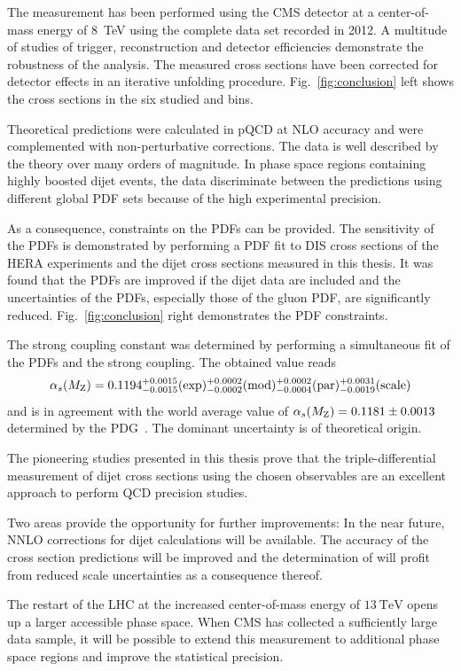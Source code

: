 The measurement has been performed using the CMS detector at a center-of-mass
energy of \SI{8}{\TeV} using the complete data set recorded in 2012. A multitude
of studies of trigger, reconstruction and detector efficiencies demonstrate the
robustness of the analysis. The measured cross sections have been corrected for
detector effects in an iterative unfolding procedure. Fig.~\ref{fig:conclusion}
left shows the cross sections in the six studied \ystar and \yboost bins.

Theoretical predictions were calculated in pQCD at NLO accuracy and were
complemented with non-perturbative corrections. The data is well
described by the theory over many orders of magnitude. In phase space regions
containing highly boosted dijet events, the data discriminate between the
predictions using different global PDF sets because of the high experimental
precision.

As a consequence, constraints on the PDFs can be provided. The sensitivity of
the PDFs is demonstrated by performing a PDF fit to DIS cross sections of the
HERA experiments and the dijet cross sections measured in this thesis. It was
found that the PDFs are improved if the dijet data are included and the
uncertainties of the PDFs, especially those of the gluon PDF, are
significantly reduced. Fig.~\ref{fig:conclusion} right demonstrates the PDF
constraints.

The strong coupling constant \asmz was determined by performing a simultaneous
fit of the PDFs and the strong coupling. The obtained value reads
%
\begin{equation*}
  \alpha_{s}(M_\mathrm{Z}) = 0.1194_{-0.0015}^{+0.0015}(\mathrm{exp})_{-0.0002}^{+0.0002}(\mathrm{mod})_{-0.0004}^{+0.0002}(\mathrm{par})_{-0.0019}^{+0.0031}(\mathrm{scale})
\end{equation*}
%
and is in agreement with the world average value of $\alpha_{s}(M_\mathrm{Z}) = 0.1181 \pm
0.0013$ determined by the PDG~\cite{Agashe:2014kda}. The dominant uncertainty is
of theoretical origin.

The pioneering studies presented in this thesis prove that the triple-differential
measurement of dijet cross sections using the chosen observables are an
excellent approach to perform QCD precision studies.

Two areas provide the opportunity for further improvements: In the near future,
NNLO corrections for dijet calculations will be available. The accuracy of the
cross section predictions will be improved and the determination of
\asmz will profit from reduced scale uncertainties as a consequence thereof. 

The restart of the LHC at the increased center-of-mass energy of $\SI{13}{\TeV}$
opens up a larger accessible phase space. When CMS has collected a sufficiently
large data sample, it will be possible to extend this measurement to additional
phase space regions and improve the statistical precision.

